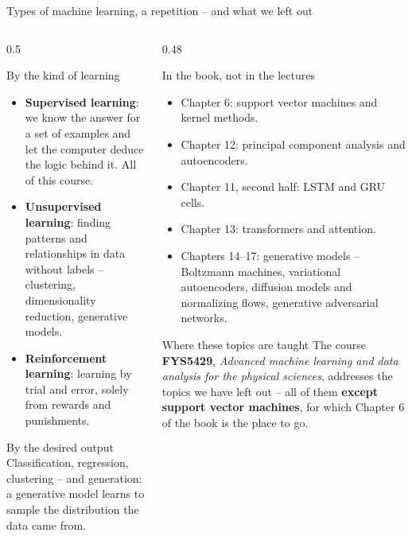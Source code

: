 \documentclass[10pt,aspectratio=169]{beamer}
\begin{document}
\begin{frame}{Types of machine learning, a repetition -- and what we left out}
\begin{columns}[T]
\begin{column}{0.5\textwidth}
\small
\begin{block}{By the kind of learning}
\footnotesize
\begin{itemize}
  \item \textbf{Supervised learning}: we know the answer for a set of
    examples and let the computer deduce the logic behind it.  All of this
    course.
  \item \textbf{Unsupervised learning}: finding patterns and relationships
    in data without labels -- clustering, dimensionality reduction,
    generative models.
  \item \textbf{Reinforcement learning}: learning by trial and error, solely
    from rewards and punishments.
\end{itemize}
\end{block}
\begin{block}{By the desired output}
\footnotesize
Classification, regression, clustering -- and generation: a generative
model learns to sample the distribution the data came from.
\end{block}
\end{column}
\begin{column}{0.48\textwidth}
\small
\begin{block}{In the book, not in the lectures}
\footnotesize
\begin{itemize}
  \item Chapter 6: support vector machines and kernel methods.
  \item Chapter 12: principal component analysis and autoencoders.
  \item Chapter 11, second half: LSTM and GRU cells.
  \item Chapter 13: transformers and attention.
  \item Chapters 14--17: generative models -- Boltzmann machines,
    variational autoencoders, diffusion models and normalizing flows,
    generative adversarial networks.
\end{itemize}
\end{block}
\begin{block}{Where these topics are taught}
\footnotesize
The course \textbf{FYS5429}, \emph{Advanced machine learning and data
analysis for the physical sciences}, addresses the topics we have left
out -- all of them \textbf{except support vector machines}, for which
Chapter 6 of the book is the place to go.
\end{block}
\end{column}
\end{columns}
\end{frame}
\end{document}
